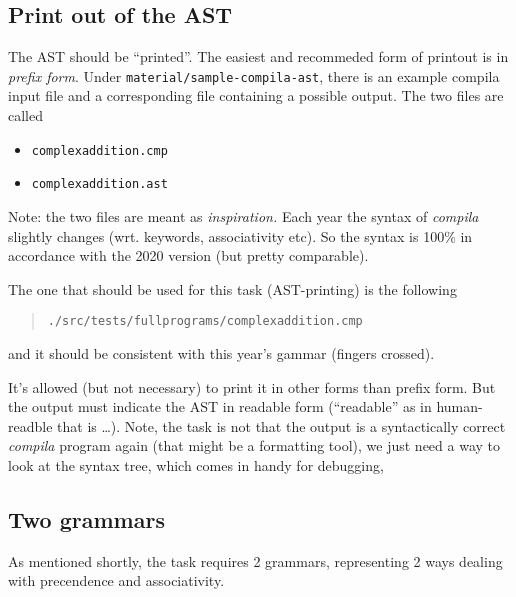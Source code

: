 \documentclass[10pt,freeform]{handout}[2014/08/13]
\begin{document}
\subsection{Print out of the AST}
\label{sec:print-out-ast}


The AST should be ``printed''. The easiest and recommeded form of printout
is in \emph{prefix form}. Under \texttt{material/sample-compila-ast}, there
is an example compila input file and a corresponding file containing a
possible output. The two files are called

\begin{itemize}
\item \texttt{complexaddition.cmp}
\item \texttt{complexaddition.ast}
\end{itemize}


Note: the two files are meant as \emph{inspiration.} Each year the syntax
of \textsl{compila} slightly changes (wrt. keywords, associativity etc). So
the syntax is 100\% in accordance with the 2020 version (but pretty
comparable).

The one that should be used for this task (AST-printing) is the following

\begin{quote}
  \texttt{./src/tests/fullprograms/complexaddition.cmp}  
\end{quote}

and it should be consistent with this year's gammar (fingers crossed).



It's allowed (but not necessary) to print it in other forms than prefix
form. But the output must indicate the AST in readable form (``readable''
as in human-readble that is \ldots). Note, the task is not that the output
is a syntactically correct \textsl{compila} program again (that might be a
formatting tool), we just need a way to look at the syntax tree, which
comes in handy for debugging,


%
% 

\subsection{Two grammars}
\label{sec:two-grammars}


As mentioned shortly, the task requires 2 grammars, representing 2 ways
dealing with precendence and associativity.
\end{document}
